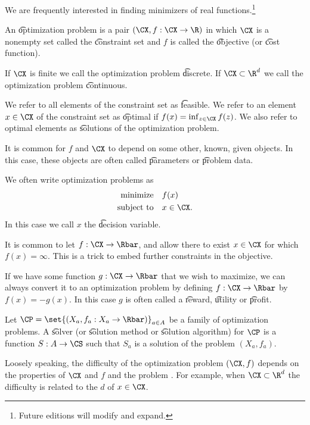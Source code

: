 

We are frequently interested in finding minimizers of real functions.\footnote{Future editions will modify and expand.}


An \t{optimization problem} is a pair $(\CX, f: \CX \to \R)$ in which $\CX$ is a nonempty set called the \t{constraint set} and $f$ is called the \t{objective} (or \t{cost function}).

If $\CX$ is finite we call the optimization problem \t{discrete}.
If $\CX \subset \R^d$ we call the optimization problem \t{continuous}.

We refer to all elements of the constraint set as \t{feasible}.
We refer to an element $x \in \CX$ of the constraint set as \t{optimal} if $f(x) = \inf_{z \in \CX}f(z)$.
We also refer to optimal elements as \t{solutions} of the optimization problem.

It is common for $f$ and $\CX$ to depend on some other, known, given objects.
In this case, these objects are often called \t{parameters} or \t{problem data}.


We often write optimization problems as
\[
  \begin{aligned}
  \text{minimize}\quad & f(x) \\
  \text{subject to}\quad & x \in \CX.
  \end{aligned}
\]
In this case we call $x$ the \t{decision variable}.


It is common to let $f: \CX \to \Rbar$, and allow there to exist $x \in \CX$ for which $f(x) = \infty$.
This is a trick to embed further constraints in the objective.


If we have some function $g: \CX \to \Rbar$ that we wish to maximize, we can always convert it to an optimization problem by defining $f: \CX \to \Rbar$ by $f(x) = -g(x)$.
In this case $g$ is often called a \t{reward}, \t{utility} or \t{profit}.


Let $\CP = \set{(X_a, f_a: X_a \to \Rbar)}_{a \in A}$ be a family of optimization problems.
A \t{solver} (or \t{solution method} or \t{solution algorithm}) for $\CP$ is a function $S: A \to \CS$ such that $S_a$ is a solution of the problem $(X_a, f_a)$.

Loosely speaking, the difficulty of  the optimization problem $(\CX, f)$ depends on the properties of $\CX$ and $f$ and the problem .
For example, when $\CX \subset \R^d$ the difficulty is related to the  $d$ of $x \in \CX$.
